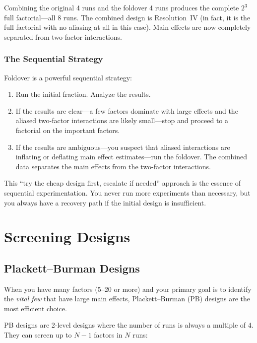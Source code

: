\documentclass[11pt]{book}
\begin{document}
Combining the original 4 runs and the foldover 4 runs produces the complete
$2^3$ full factorial---all 8 runs. The combined design is Resolution~IV (in
fact, it is the full factorial with no aliasing at all in this case). Main
effects are now completely separated from two-factor interactions.

\subsection{The Sequential Strategy}

Foldover is a powerful sequential strategy:

\begin{enumerate}[nosep]
\item Run the initial fraction. Analyze the results.
\item If the results are clear---a few factors dominate with large effects and
      the aliased two-factor interactions are likely small---stop and proceed to
      a factorial on the important factors.
\item If the results are ambiguous---you suspect that aliased interactions are
      inflating or deflating main effect estimates---run the foldover. The
      combined data separates the main effects from the two-factor interactions.
\end{enumerate}

This ``try the cheap design first, escalate if needed'' approach is the essence
of sequential experimentation. You never run more experiments than necessary,
but you always have a recovery path if the initial design is insufficient.

\chapter{Screening Designs}

\section{Plackett--Burman Designs}

When you have many factors (5--20 or more) and your primary goal is to identify
the \emph{vital few} that have large main effects, Plackett--Burman (PB) designs
are the most efficient choice.

PB designs are 2-level designs where the number of runs is always a multiple of
4. They can screen up to $N-1$ factors in $N$ runs:
\end{document}
